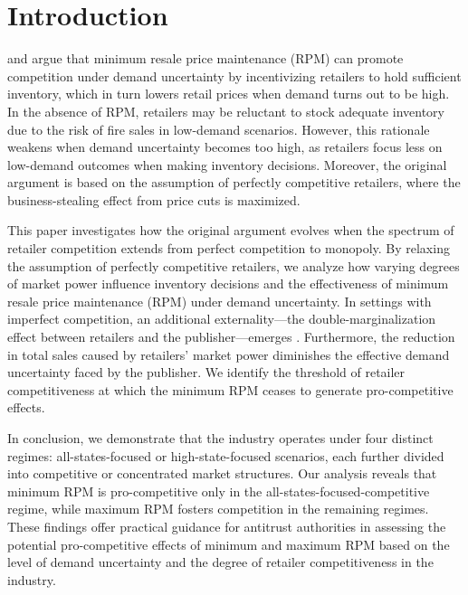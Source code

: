 \documentclass[12pt]{article}
\begin{document}
\begin{titlepage}
\begin{abstract}
\bigskip
\end{abstract}
\setcounter{page}{0}
\thispagestyle{empty}
\end{titlepage}
\pagebreak \newpage

\section{Introduction}


\cite{deneckereDemandUncertaintyPrice1997} and \cite{deneckereDemandUncertaintyPrice1997} argue that minimum resale price maintenance (RPM) can promote competition under demand uncertainty by incentivizing retailers to hold sufficient inventory, which in turn lowers retail prices when demand turns out to be high. In the absence of RPM, retailers may be reluctant to stock adequate inventory due to the risk of fire sales in low-demand scenarios. However, this rationale weakens when demand uncertainty becomes too high, as retailers focus less on low-demand outcomes when making inventory decisions. Moreover, the original argument is based on the assumption of perfectly competitive retailers, where the business-stealing effect from price cuts is maximized.

This paper investigates how the original argument evolves when the spectrum of retailer competition extends from perfect competition to monopoly. By relaxing the assumption of perfectly competitive retailers, we analyze how varying degrees of market power influence inventory decisions and the effectiveness of minimum resale price maintenance (RPM) under demand uncertainty. In settings with imperfect competition, an additional externality—the double-marginalization effect between retailers and the publisher—emerges \citep{tiroleTheoryIndustrialOrganization1988, kleinDistributionRestrictionsOperate1999, blairWillKhanFoster1999}. Furthermore, the reduction in total sales caused by retailers' market power diminishes the effective demand uncertainty faced by the publisher. We identify the threshold of retailer competitiveness at which the minimum RPM ceases to generate pro-competitive effects.

In conclusion, we demonstrate that the industry operates under four distinct regimes: all-states-focused or high-state-focused scenarios, each further divided into competitive or concentrated market structures. Our analysis reveals that minimum RPM is pro-competitive only in the all-states-focused-competitive regime, while maximum RPM fosters competition in the remaining regimes. These findings offer practical guidance for antitrust authorities in assessing the potential pro-competitive effects of minimum and maximum RPM based on the level of demand uncertainty and the degree of retailer competitiveness in the industry.
\end{document}
